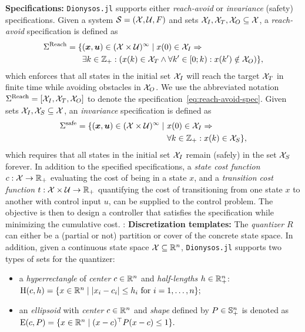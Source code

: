 \documentclass{juliacon}
\begin{document}
\vskip 6pt
\textbf{Specifications:}
\texttt{Dionysos.jl} supports either \emph{reach-avoid} or \emph{invariance} (safety) specifications. 
Given a system $\mathcal{S} = (\mathcal{X},\mathcal{U},F)$ and sets $\mathcal{X}_I, \mathcal{X}_T, \mathcal{X}_O \subseteq \mathcal{X}$, a \emph{reach-avoid} specification is defined as
\begin{align}
\Sigma^{\text{Reach}} = \{ &(\boldsymbol{x},\boldsymbol{u}) \in (\mathcal{X} \times \mathcal{U})^\infty \mid x(0) \in \mathcal{X}_I \Rightarrow \nonumber \\
&\exists k \in \mathbb{Z}_+ : \left(x(k) \in \mathcal{X}_T \land \forall k' \in [0;k):x(k')\notin \mathcal{X}_O\right) \}, \label{eq:reach-avoid-spec}
\end{align}
which enforces that all states in the initial set $\mathcal{X}_I$ will reach the target $\mathcal{X}_T$ in finite time while avoiding obstacles in $\mathcal{X}_O$. We use the abbreviated notation $\Sigma^{\text{Reach}}=[\mathcal{X}_I,\mathcal{X}_T,\mathcal{X}_O]$ to denote the specification~\eqref{eq:reach-avoid-spec}. 
Given sets $\mathcal{X}_I,\mathcal{X}_S\subseteq \mathcal{X}$, an \emph{invariance} specification is defined as
\begin{align}
    \Sigma^{\text{safe}} = \{(\boldsymbol{x},\boldsymbol{u})\in (\mathcal{X}\times \mathcal{U})^{\infty}\mid\ &x(0)\in \mathcal{X}_I \Rightarrow \nonumber \\
    &\forall k \in \mathbb{Z}_+: x(k)\in \mathcal{X}_S\}, \label{eq:invariance-spec} 
\end{align}
which requires that all states in the initial set $\mathcal{X}_I$ remain (safely) in the set $\mathcal{X}_S$ forever.
In addition to the specified specifications, a \emph{state cost function} $c:\mathcal{X}\rightarrow \mathbb{R}_+$ evaluating the cost of being in a state $x$, and a \emph{transition cost function} $t:\mathcal{X}\times \mathcal{U}\rightarrow \mathbb{R}_+$ quantifying the cost of transitioning from one state $x$ to another with control input $u$, can be supplied to the control problem. The objective is then to design a controller that satisfies the specification while minimizing the cumulative cost.
:
\vskip 6pt
\textbf{Discretization templates:} The \emph{quantizer} $R$ can either be a (partial or not) partition or cover of the concrete state space. In addition, given a continuous state space $\mathcal{X}\subseteq \mathbb{R}^n$, \texttt{Dionysos.jl} supports two types of sets for the quantizer:
\begin{itemize}
    \item a \emph{hyperrectangle} of \emph{center} $ c\in\mathbb{R}^n$ and \emph{half-lengths} $h\in \mathbb{R}^n_{+}$: $\operatorname{H}(c,h) = \{x\in\mathbb{R}^n \mid |x_i-c_i|\le h_i \text{ for }i=1,\ldots,n\};$
    \item an \emph{ellipsoid} with \emph{center} $c\in\mathbb{R}^n$ and \emph{shape} defined by $P\in \mathbb{S}_{+}^{n}$ is denoted as $\operatorname{E}(c,P) =  \{x\in\mathbb{R}^n\mid (x-c)^\top P(x-c) \le 1\}.$
\end{itemize}
\end{document}
